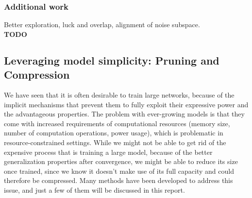 

\subsubsection*{Additional work}
Better exploration, luck and overlap, alignment of noise subspace. \\

\textbf{TODO}

\subsection{Leveraging model simplicity: Pruning and Compression}

We have seen that it is often desirable to train large networks, because of the implicit mechanisms that prevent them to fully exploit their expressive power and the advantageous properties. The problem with ever-growing models is that they come with increased requirements of computational resources (memory size, number of computation operations, power usage), which is problematic in resource-constrained settings. While we might not be able to get rid of the expensive process that is training a large model, because of the better generalization properties after convergence, we might be able to reduce its size once trained, since we know it doesn't make use of its full capacity and could therefore be compressed. Many methods have been developed to address this issue, and just a few of them will be discussed in this report. \\

